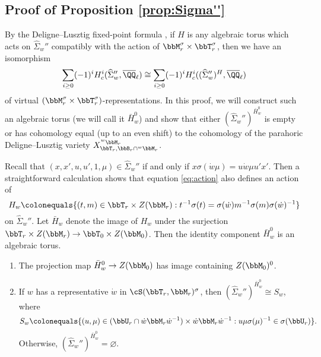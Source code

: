 \subsection{Proof of Proposition \ref{prop:Sigma''}}\label{subsec:Sigma'' proof}
  By the Deligne--Lusztig fixed-point formula \cite[Theorem 3.2]{DL76}, if $H$ is any algebraic torus which acts on $\widehat \Sigma_w''$ compatibly with the action of $\bbM_r^\sigma \times \bbT_r^\sigma$, then we have an isomorphism
  \begin{equation*}
    \sum_{i \geq 0} (-1)^i H_c^i(\widehat \Sigma_w'', \overline \QQ_\ell) \cong     \sum_{i \geq 0} (-1)^i H_c^i((\widehat \Sigma_w'')^{H}, \overline \QQ_\ell)
  \end{equation*}
  of virtual $(\bbM_r^\sigma \times \bbT_r^\sigma)$-representations. In this proof, we will construct such an algebraic torus (we will call it $\bar H_w^0$) and show that either $(\widehat \Sigma_w'')^{\bar H_w^0}$ is empty or has cohomology equal (up to an even shift) to the cohomology of the parahoric Deligne--Lusztig variety $X_{\bbT_r, \bbB_r \cap {}^w \bbM_r}^{{}^w \bbM_r}$. 

  Recall that $(x,x',u,u',1,\mu) \in \widehat \Sigma_w''$ if and only if $x\sigma(\dot w \mu) = u \dot w \mu u' x'$. Then a straightforward calculation shows that equation \eqref{eq:action} also defines an action of
  \begin{equation*}
    H_w \colonequals \{(t,m) \in \bbT_r \times Z(\bbM_r) : 
    t^{-1}\sigma(t) = \sigma(\dot w) m^{-1}\sigma(m) \sigma(\dot w)^{-1}\}
  \end{equation*}
  on $\widehat \Sigma_w''$. Let $\bar H_w$ denote the image of $H_w$ under the surjection $\bbT_r \times Z(\bbM_r) \to \bbT_0 \times Z(\bbM_0)$. Then the identity component $\bar H_w^0$ is an algebraic torus.

  \begin{claim}\mbox{}
    \begin{enumerate}[label=(\alph*)]
      \item The projection map $\bar H_w^0 \to Z(\bbM_0)$ has image containing $Z(\bbM_0)^0$.
      \item If $w$ has a representative $\dot w$ in $\cS(\bbT_r,\bbM_r)^\sigma$, then $(\widehat \Sigma_w'')^{\bar H_w^0} \cong S_w$, where
      \begin{equation*}
        S_w \colonequals \{(u,\mu) \in (\bbU_r \cap \dot w \bbM_r \dot w^{-1}) \times \dot w \bbM_r \dot w^{-1} : u \mu \sigma(\mu)^{-1} \in \sigma(\bbU_r)\}.
      \end{equation*}
      Otherwise, $(\widehat \Sigma_w'')^{\bar H_w^0} = \varnothing.$
    \end{enumerate}
  \end{claim}

